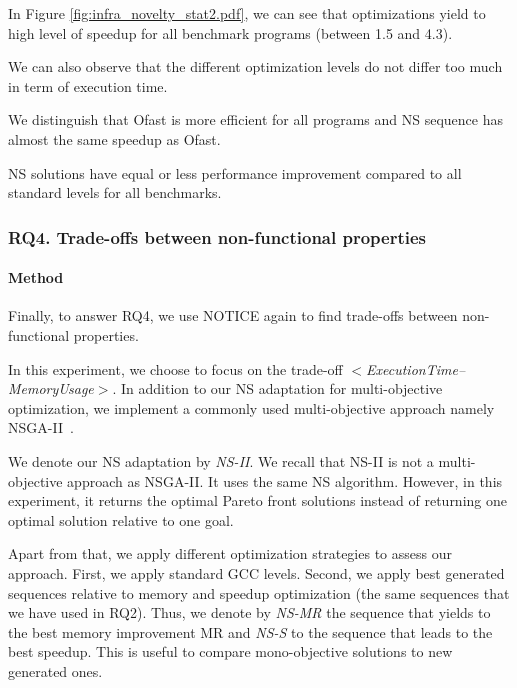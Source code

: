 In Figure \ref{fig:infra_novelty_stat2.pdf}, we can see that optimizations yield to high level of speedup for all benchmark programs (between 1.5 and 4.3).

We can also observe that the different optimization levels do not differ too much in term of execution time. 

We distinguish that Ofast is more efficient for all programs and NS sequence has almost the same speedup as Ofast. 

NS solutions have equal or less performance improvement compared to all standard levels for all benchmarks. 




\noindent{}
	
\subsubsection{RQ4. Trade-offs between non-functional properties}
\paragraph{Method}
Finally, to answer RQ4, we use NOTICE again to find trade-offs between non-functional properties. 

In this experiment, we choose to focus on the trade-off \textit{$<$ExecutionTime--MemoryUsage$>$}. In addition to our NS adaptation for multi-objective optimization, we implement a commonly used multi-objective approach namely NSGA-II~\cite{deb2002fast}. 

We denote our NS adaptation by \textit{NS-II}. We recall that NS-II is not a multi-objective approach as NSGA-II. It uses the same NS algorithm. However, in this experiment, it returns the optimal Pareto front solutions instead of returning one optimal solution relative to one goal. 

Apart from that, we apply different optimization strategies to assess our approach. 	
First, we apply standard GCC levels. Second, we apply best generated sequences relative to memory and speedup optimization (the same sequences that we have used in RQ2). Thus, we denote by \textit{NS-MR} the sequence that yields to the best memory improvement MR and \textit{NS-S} to the sequence that leads to the best speedup. This is useful to compare mono-objective solutions to new generated ones.
	
